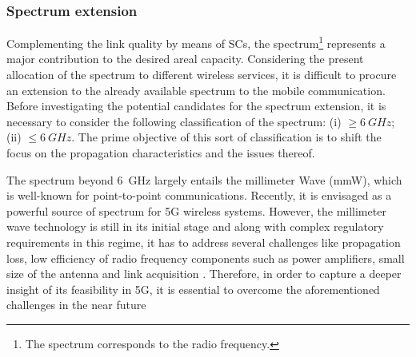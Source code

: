 \subsubsection*{Spectrum extension}
Complementing the link quality by means of SCs, the spectrum\footnote{The spectrum corresponds to the radio frequency.} represents a major contribution to the desired areal capacity. Considering the present allocation of the spectrum to different wireless services, it is difficult to procure an extension to the already available spectrum to the mobile communication. Before investigating the potential candidates for the spectrum extension, it is necessary to consider the following classification of the spectrum:
(i) $\ge \SI{6}{GHz}$;
(ii) $\le \SI{6}{GHz}$.
The prime objective of this sort of classification is to shift the focus on the propagation characteristics and the issues thereof.


The spectrum beyond \SI{6}{GHz} largely entails the millimeter Wave (mmW), which is well-known for point-to-point communications. Recently, it is envisaged as a powerful source of spectrum for 5G wireless systems. However, the millimeter wave technology is still in its initial stage and along with complex regulatory requirements in this regime, it has to address several challenges like propagation loss, low efficiency of radio frequency components such as power amplifiers, small size of the antenna and link acquisition \cite{Rapp13}. Therefore, in order to capture a deeper insight of its feasibility in 5G, it is essential to overcome the aforementioned challenges in the near future

